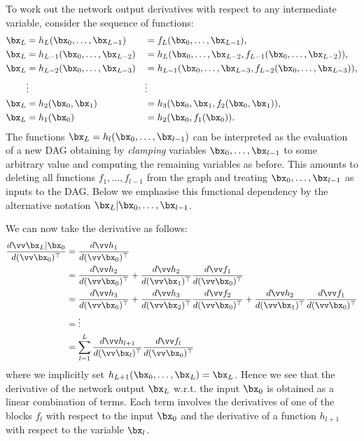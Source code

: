 To work out the network output derivatives with respect to any intermediate variable, consider the sequence of functions:
\[
\begin{aligned}
  \bx_L &= h_L(\bx_0,\dots,\bx_{L-1}) &&= f_L(\bx_0,\dots,\bx_{L-1}),
\\
  \bx_L &= h_{L-1}(\bx_0,\dots,\bx_{L-2}) &&= h_L(\bx_0,\dots,\bx_{L-2},f_{L-1}(\bx_0,\dots,\bx_{L-2})),
 \\
  \bx_L &= h_{L-2}(\bx_0,\dots,\bx_{L-3}) &&= h_{L-1}(\bx_0,\dots,\bx_{L-3},f_{L-2}(\bx_0,\dots,\bx_{L-3})),
  \\
  &\vdots &&\vdots
  \\
  \bx_L &= h_2(\bx_0,\bx_1) &&= h_3(\bx_0,\bx_1,f_2(\bx_0,\bx_1)),
  \\
  \bx_L &= h_1(\bx_0)  &&= h_2(\bx_0, f_1(\bx_0)).
  \end{aligned}
\]
The functions $\bx_L= h_l(\bx_0,\dots,\bx_{l-1})$ can be interpreted as the evaluation of a new DAG obtaining by \emph{clamping} variables $\bx_0,\dots,\bx_{l-1}$ to some arbitrary value and computing the remaining variables as before. This amounts to deleting all functions $f_1,\dots,f_{l-1}$ from the graph and treating $\bx_0,\dots,\bx_{l-1}$ as inputs to the DAG. Below we emphasise this functional dependency by the alternative notation $\bx_L|\bx_0,\dots,\bx_{l-1}$.

We can now take the derivative as follows:
\begin{align*}
\frac{d \vv \bx_L | \bx_0}{d(\vv \bx_0)^\top}
&=
\frac{d\vv h_1}{d(\vv \bx_0)^\top} \\
&=
\frac{d\vv h_2}{d(\vv \bx_0)^\top} +
\frac{d\vv h_2}{d(\vv \bx_1)^\top} \frac{d\vv f_1}{d(\vv \bx_0)^\top}
\\
&=
\frac{d\vv h_3}{d(\vv \bx_0)^\top} +
\frac{d\vv h_3}{d(\vv \bx_2)^\top} \frac{d\vv f_2}{d(\vv \bx_0)^\top} +
\frac{d\vv h_2}{d(\vv \bx_1)^\top} \frac{d\vv f_1}{d(\vv \bx_0)^\top}
\\
&=
\vdots
\\
&=
\sum_{l=1}^L
\frac{d\vv h_{l+1}}{d(\vv \bx_l)^\top}
\frac{d\vv f_l}{d(\vv \bx_0)^\top}
\end{align*}
where we implicitly set $h_{L+1}(\bx_0,\dots,\bx_L) = \bx_L$. Hence we see that the derivative of the network output $\bx_L$ w.r.t. the input $\bx_0$ is obtained as a linear combination of terms. Each term involves the derivatives of one of the blocks $f_l$ with respect to the input $\bx_0$ and the derivative of a function $h_{l+1}$ with respect to the variable $\bx_l$.

